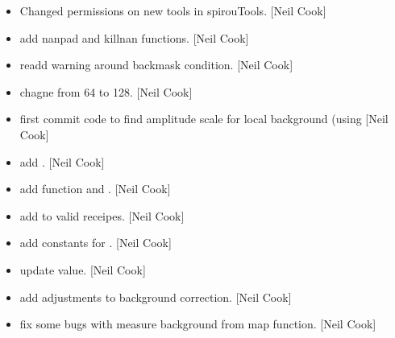 \documentclass[a4paper,10pt,english]{report}
\begin{document}
\begin{itemize}
\item {} 
Changed permissions on new tools in spirouTools. {[}Neil Cook{]}

\item {} 
 \sphinxhyphen{} add nanpad and killnan functions. {[}Neil Cook{]}

\item {} 
 \sphinxhyphen{} re\sphinxhyphen{}add warning around backmask condition. {[}Neil Cook{]}

\item {} 
 \sphinxhyphen{} chagne  from 64 to 128.
{[}Neil Cook{]}

\item {} 
 \sphinxhyphen{} first commit \sphinxhyphen{} code to find amplitude scale
for local background (using  {[}Neil Cook{]}

\item {} 
 \sphinxhyphen{} add . {[}Neil Cook{]}

\item {} 
 \sphinxhyphen{} add function  and
. {[}Neil Cook{]}

\item {} 
 \sphinxhyphen{} add  to valid receipes. {[}Neil
Cook{]}

\item {} 
 \sphinxhyphen{} add constants for .
{[}Neil Cook{]}

\item {} 
 \sphinxhyphen{} update  value. {[}Neil Cook{]}

\item {} 
 \sphinxhyphen{} add adjustments to background correction. {[}Neil Cook{]}

\item {} 
 \sphinxhyphen{} fix some bugs with measure background from map
function. {[}Neil Cook{]}


\end{itemize}
\end{document}
